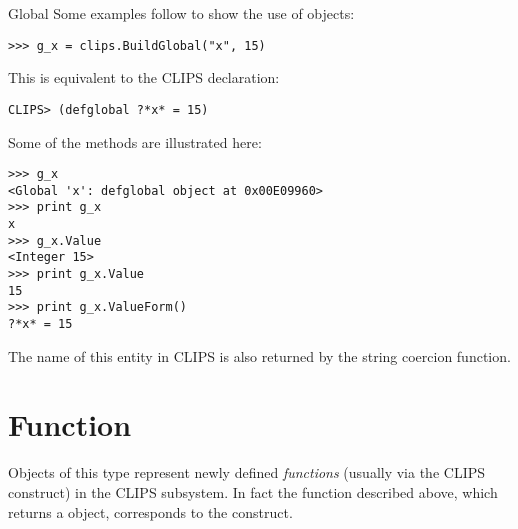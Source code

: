 \begin{classdesc*}{Global}
Some examples follow to show the use of  objects:

\begin{verbatim}
>>> g_x = clips.BuildGlobal("x", 15)
\end{verbatim}

This is equivalent to the CLIPS declaration:

\begin{verbatim}
CLIPS> (defglobal ?*x* = 15)
\end{verbatim}

Some of the  methods are illustrated here:

\begin{verbatim}
>>> g_x
<Global 'x': defglobal object at 0x00E09960>
>>> print g_x
x
>>> g_x.Value
<Integer 15>
>>> print g_x.Value
15
>>> print g_x.ValueForm()
?*x* = 15
\end{verbatim}

The name of this entity in CLIPS is also returned by the string coercion
function.

\end{classdesc*}



\section{Function\label{pyclips-cl-Function}}

Objects of this type represent newly defined \emph{functions}
(usually via the CLIPS  construct) in the CLIPS
subsystem. In fact the  function described
above, which returns a  object, corresponds to the
 construct.

